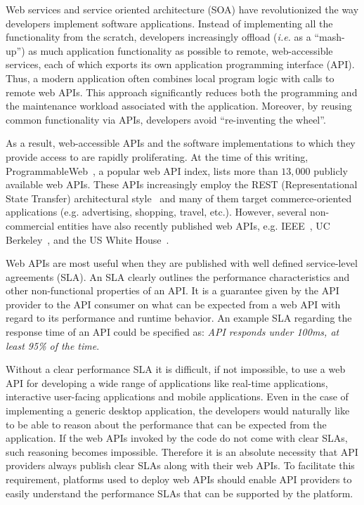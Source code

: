 Web services and service oriented architecture (SOA) have
revolutionized the way developers implement software applications.
Instead of implementing all the functionality from the scratch, developers
increasingly offload ({\em i.e.} as a ``mash-up'') as much application functionality 
as possible to remote,
web-accessible services, each of which exports its own application programming
interface (API). Thus, a modern application often combines local program logic
with calls to remote web APIs.
This approach significantly reduces both the programming and
the maintenance workload associated with the application.
Moreover, by reusing common functionality via APIs, developers avoid ``re-inventing the
wheel''.

As a result, web-accessible APIs and the software implementations to which
they provide access to are rapidly proliferating.
At the time of this writing, 
ProgrammableWeb~\cite{pweb}, a popular web API index, lists more than $13,000$
publicly available web APIs.
These APIs increasingly employ the REST (Representational State Transfer) architectural style~\cite{Fielding:2000:ASD:932295} and 
many of them target commerce-oriented applications (e.g. advertising, shopping, travel, etc.).
However, several non-commercial entities have also recently published web 
APIs, e.g. IEEE~\cite{ieeeapis}, UC Berkeley~\cite{ucbapis}, and the US White
House~\cite{whitehouseapis}. 

Web APIs are most useful when they are published with well defined service-level agreements (SLA). 
An SLA clearly outlines the performance characteristics and other non-functional 
properties of an API. It is a guarantee given by the API provider to the API consumer on what can be
expected from a web API with regard to its performance and runtime behavior. An example SLA regarding
the response time of an API could be specified as: \textit{API responds under 100ms, at least 95\% of the time}.

Without a clear performance SLA it is difficult, if not impossible,
to use a web API for developing a wide range of applications like real-time applications, interactive
user-facing applications and mobile applications. Even in the case of implementing a generic desktop
application, the developers would naturally like to be able to reason about
the performance that can be expected from the application. If the web APIs invoked by the code do
not come with clear SLAs, such reasoning becomes impossible. Therefore it is an absolute
necessity that API providers always publish clear SLAs along with their web APIs. To
facilitate this requirement, platforms used to deploy web APIs should enable API providers to 
easily understand the performance SLAs that can be supported by the platform.

